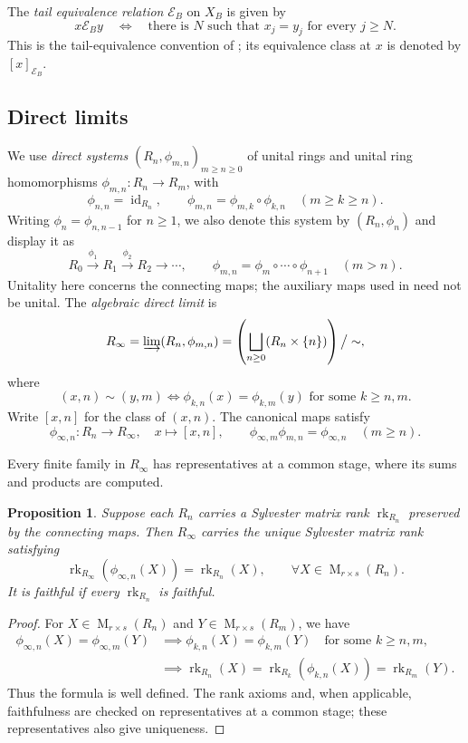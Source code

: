 \documentclass[11pt]{amsart}
\DeclareMathOperator{\rk}{rk}
\DeclareMathOperator{\Mat}{M}
\DeclareMathOperator{\id}{id}
\newtheorem{proposition}[theorem]{Proposition}
\theoremstyle{definition}
\theoremstyle{remark}
\begin{document}
The \emph{tail equivalence relation} $\mathcal E_B$ on $X_B$ is given by
\[
  x\mathrel{\mathcal E_B}y
  \quad\Longleftrightarrow\quad
  \text{there is }N\text{ such that }x_j=y_j\text{ for every }j\geq N.
\]
This is the tail-equivalence convention of
\cite[Section~2.2]{BezuglyiKarpel2016}; its equivalence class at $x$ is denoted
by $[x]_{\mathcal E_B}$.

\subsection{Direct limits}

We use \emph{direct systems} $(R_n,\phi_{m,n})_{m\geq n\geq0}$ of unital
rings and unital ring homomorphisms $\phi_{m,n}\colon R_n\to R_m$, with
\[
 \phi_{n,n}=\id_{R_n},\qquad
 \phi_{m,n}=\phi_{m,k}\circ\phi_{k,n}\quad(m\geq k\geq n).
\]
Writing $\phi_n=\phi_{n,n-1}$ for $n\geq1$, we also denote this system
by $(R_n,\phi_n)$ and display it as
\[
 R_0\xrightarrow{\phi_1}R_1\xrightarrow{\phi_2}R_2\longrightarrow\cdots,
 \qquad \phi_{m,n}=\phi_m\circ\cdots\circ\phi_{n+1}\quad(m>n).
\]
Unitality here concerns the connecting maps; the auxiliary maps used in
 need not be unital.
The \emph{algebraic direct limit} is
\[
 R_\infty=\varinjlim(R_n,\phi_{m,n})
 =\left(\bigsqcup_{n\geq0}(R_n\times\{n\})\right)\big/\sim,
\]
where
\[
 (x,n)\sim(y,m)
 \iff \phi_{k,n}(x)=\phi_{k,m}(y)\text{ for some }k\geq n,m.
\]
Write $[x,n]$ for the class of $(x,n)$.  The canonical maps satisfy
\[
 \phi_{\infty,n}\colon R_n\to R_\infty,\quad x\mapsto[x,n],
 \qquad
 \phi_{\infty,m}\phi_{m,n}=\phi_{\infty,n}\quad(m\geq n).
\]

Every finite family in $R_\infty$ has representatives at a common stage,
where its sums and products are computed.

\begin{proposition}\label{prop:direct-limit-rank}
Suppose each $R_n$ carries a Sylvester matrix rank $\rk_{R_n}$
preserved by the connecting maps.
Then $R_\infty$ carries the unique Sylvester matrix rank satisfying
\[
 \rk_{R_\infty}(\phi_{\infty,n}(X))=\rk_{R_n}(X),
 \qquad \forall X\in\Mat_{r\times s}(R_n).
\]
It is faithful if every $\rk_{R_n}$ is faithful.
\end{proposition}

\begin{proof}
For \(X\in\Mat_{r\times s}(R_n)\) and \(Y\in\Mat_{r\times s}(R_m)\), we have
\[
 \begin{aligned}
 \phi_{\infty,n}(X)=\phi_{\infty,m}(Y)
 &\implies \phi_{k,n}(X)=\phi_{k,m}(Y)\quad\text{for some }k\geq n,m,\\
 &\implies \rk_{R_n}(X)=\rk_{R_k}(\phi_{k,n}(X))
   =\rk_{R_m}(Y).
 \end{aligned}
\]
Thus the formula is well defined.  The rank axioms and, when applicable,
faithfulness are checked on representatives at a common stage;
these representatives also give uniqueness.
\end{proof}
\end{document}
